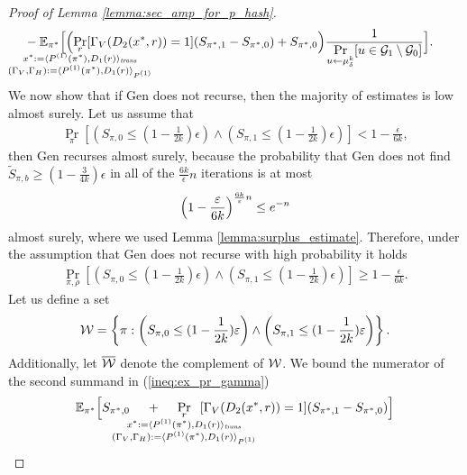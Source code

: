 \begin{proof}[Proof of Lemma \ref{lemma:sec_amp_for_p_hash}]
\begin{align}
&- \mathbb{E}_{\pi^*}\Bigl[\Bigl(
\underset{\mathclap{
  \substack{r \\ x^* := \langle P^{(1)}(\pi^*), D_1(r) \rangle_{\mathit{trans}} \\ (\Gamma_V, \Gamma_H) := \langle P^{(1)}(\pi^*), D_1(r) \rangle_{P^{(1)}} }}}
{\Pr}[\Gamma_V(D_2(x^*, r)) = 1](S_{\pi^*,1} - S_{\pi^*,0})
 + S_{\pi^*,0}\Bigr)
\frac{1}{\underset{u \leftarrow \mu_{\delta}^k}{\Pr}[ u \in \cG_1 \setminus\cG_0]}\Bigr].
\end{align}
We now show that if Gen does not recurse, then the majority of estimates is low almost surely.
Let us assume that
\begin{align}
\underset{\pi}{\Pr}\left[\left(S_{\pi,0} \leq (1 - \frac{1}{2k})\epsilon\right) \land \left( S_{\pi,1} \leq (1-\frac{1}{2k})\epsilon\right)\right] < 1 - \frac{\epsilon}{6k},
\end{align}
then Gen recurses almost surely, because the probability that
Gen does not find $\widetilde{S}_{\pi, b} \geq (1-\frac{3}{4k})\epsilon$ in all of the $\frac{6k}{\epsilon}n$ iterations is at most
\begin{align*}
  \Bigl(1 - \frac{\epsilon}{6k}\Bigr)^{\frac{6k}{\epsilon}n} \leq e^{-n}
\end{align*}
almost surely, where we used Lemma \ref{lemma:surplus_estimate}.
Therefore, under the assumption that Gen does not recurse with high probability it holds
\begin{align}
\underset{\pi, \rho}{\Pr}\left[\left(S_{\pi,0} \leq (1 - \frac{1}{2k})\epsilon\right) \land \left( S_{\pi,1} \leq (1-\frac{1}{2k})\epsilon\right)\right] \geq 1 - \frac{\epsilon}{6k}.
\end{align}
Let us define a set
\begin{align}
  \cW = \left\{ \pi :  \left(S_{\pi,0} \leq (1 - \frac{1}{2k})\epsilon\right) \land \left( S_{\pi,1} \leq (1-\frac{1}{2k})\epsilon \right) \right\}.
\end{align}
Additionally, let $\overline{\cW}$ denote the complement of $\cW$.
We bound the numerator of the second summand in (\ref{ineq:ex_pr_gamma})
\begin{align}
  \label{ineq:second_eq}
&\mathbb{E}_{\pi^*}\Big[ S_{\pi^*,0}
\mkern23mu
+
\mkern23mu
\underset{
  \mathclap{
  \substack{r \\ x^* := \langle P^{(1)}(\pi^*), D_1(r) \rangle_{\mathit{trans}}
    \\ (\Gamma_V, \Gamma_H) := \langle P^{(1)}(\pi^*), D_1 (r) \rangle_{P^{(1)}} }}}
{\Pr}\mkern13mu[\Gamma_V(D_2(x^*, r)) = 1]
(S_{\pi^*,1} - S_{\pi^*,0})\Big] \notag\\

\end{align}
\end{proof}
